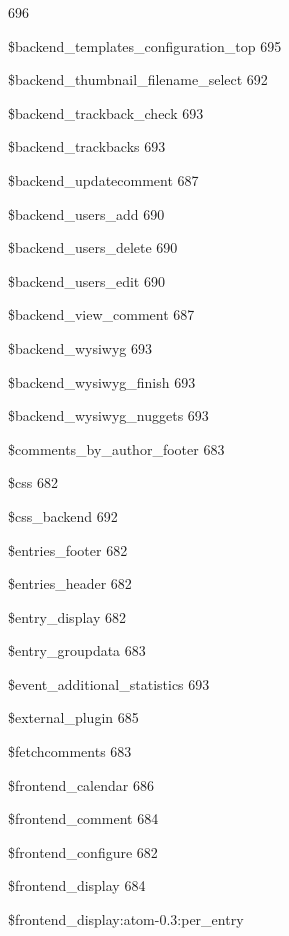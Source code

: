 \documentclass{book}
\renewcommand\subsubitem{\par\hspace*{3mm}}
\begin{document}
\begin{multicols}{2}
\begin{osp-index}
		696
      \subsubitem \$backend\_templates\_configuration\_top\hspace{1mm} 
		695
      \subsubitem \$backend\_thumbnail\_filename\_select\hspace{1mm} 
		692
      \subsubitem \$backend\_trackback\_check\hspace{1mm} 693
      \subsubitem \$backend\_trackbacks\hspace{1mm} 693
      \subsubitem \$backend\_updatecomment\hspace{1mm} 687
      \subsubitem \$backend\_users\_add\hspace{1mm} 690
      \subsubitem \$backend\_users\_delete\hspace{1mm} 690
      \subsubitem \$backend\_users\_edit\hspace{1mm} 690
      \subsubitem \$backend\_view\_comment\hspace{1mm} 687
      \subsubitem \$backend\_wysiwyg\hspace{1mm} 693
      \subsubitem \$backend\_wysiwyg\_finish\hspace{1mm} 693
      \subsubitem \$backend\_wysiwyg\_nuggets\hspace{1mm} 693
      \subsubitem \$comments\_by\_author\_footer\hspace{1mm} 683
      \subsubitem \$css\hspace{1mm} 682
      \subsubitem \$css\_backend\hspace{1mm} 692
      \subsubitem \$entries\_footer\hspace{1mm} 682
      \subsubitem \$entries\_header\hspace{1mm} 682
      \subsubitem \$entry\_display\hspace{1mm} 682
      \subsubitem \$entry\_groupdata\hspace{1mm} 683
      \subsubitem \$event\_additional\_statistics\hspace{1mm} 693
      \subsubitem \$external\_plugin\hspace{1mm} 685
      \subsubitem \$fetchcomments\hspace{1mm} 683
      \subsubitem \$frontend\_calendar\hspace{1mm} 686
      \subsubitem \$frontend\_comment\hspace{1mm} 684
      \subsubitem \$frontend\_configure\hspace{1mm} 682
      \subsubitem \$frontend\_display\hspace{1mm} 684
      \subsubitem \$frontend\_display:atom-0.3:per\_entry\hspace{1mm} 

\end{osp-index}
\end{multicols}
\end{document}
